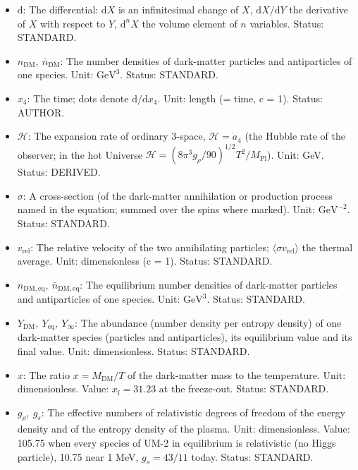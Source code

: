 \documentclass[
  10pt,
]{article}
\providecommand{\tightlist}{%
  \setlength{\itemsep}{0pt}\setlength{\parskip}{0pt}}
\begin{document}
\begin{itemize}
\tightlist
\item
  \(\mathrm{d}\): The differential: \(\mathrm{d}X\) is an infinitesimal
  change of \(X\), \(\mathrm{d}X/\mathrm{d}Y\) the derivative of \(X\)
  with respect to \(Y\), \(\mathrm{d}^nX\) the volume element of \(n\)
  variables. Status: STANDARD.
\item
  \(n_{\mathrm{DM}},\ \bar n_{\mathrm{DM}}\): The number densities of
  dark-matter particles and antiparticles of one species. Unit:
  \(\mathrm{GeV}^{3}\). Status: STANDARD.
\item
  \(x_4\): The time; dots denote \(\mathrm{d}/\mathrm{d}x_4\). Unit:
  length (= time, c = 1). Status: AUTHOR.
\item
  \(\mathcal{H}\): The expansion rate of ordinary 3-space,
  \(\mathcal{H} = \dot a_4\) (the Hubble rate of the observer; in the
  hot Universe
  \(\mathcal{H} = (8\pi^3g_\rho/90)^{1/2}T^2/M_{\mathrm{Pl}}\)). Unit:
  GeV. Status: DERIVED.
\item
  \(\sigma\): A cross-section (of the dark-matter annihilation or
  production process named in the equation; summed over the spins where
  marked). Unit: \(\mathrm{GeV}^{-2}\). Status: STANDARD.
\item
  \(v_{\mathrm{rel}}\): The relative velocity of the two annihilating
  particles; \(\langle\sigma v_{\mathrm{rel}}\rangle\) the thermal
  average. Unit: dimensionless (c = 1). Status: STANDARD.
\item
  \(n_{\mathrm{DM,eq}},\ \bar n_{\mathrm{DM,eq}}\): The equilibrium
  number densities of dark-matter particles and antiparticles of one
  species. Unit: \(\mathrm{GeV}^{3}\). Status: STANDARD.
\item
  \(Y_{\mathrm{DM}},\ Y_{\mathrm{eq}},\ Y_\infty\): The abundance
  (number density per entropy density) of one dark-matter species
  (particles and antiparticles), its equilibrium value and its final
  value. Unit: dimensionless. Status: STANDARD.
\item
  \(x\): The ratio \(x = M_{\mathrm{DM}}/T\) of the dark-matter mass to
  the temperature. Unit: dimensionless. Value:
  \(x_{\mathrm{f}} = 31.23\) at the freeze-out. Status: STANDARD.
\item
  \(g_\rho,\ g_s\): The effective numbers of relativistic degrees of
  freedom of the energy density and of the entropy density of the
  plasma. Unit: dimensionless. Value: 105.75 when every species of UM-2
  in equilibrium is relativistic (no Higgs particle), 10.75 near 1 MeV,
  \(g_s = 43/11\) today. Status: STANDARD.

\end{itemize}
\end{document}
